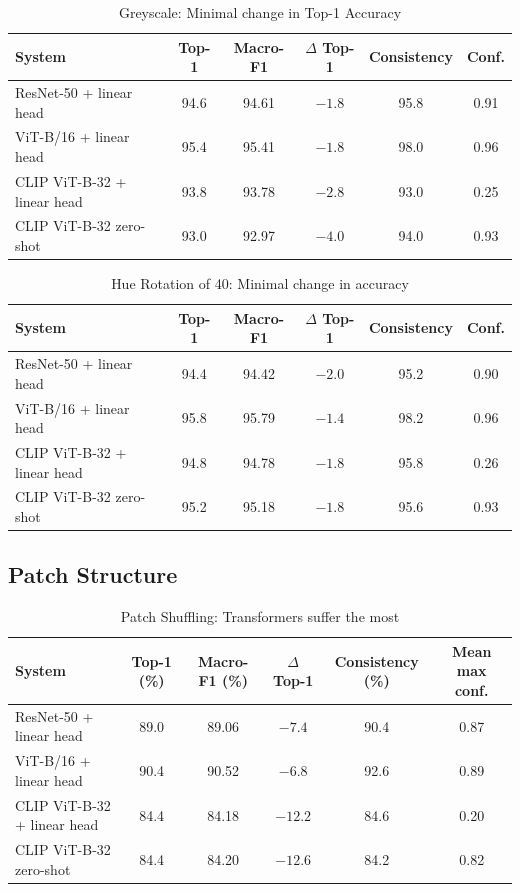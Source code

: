 \documentclass{article}
\begin{document}
\begin{table}[H]
  \caption{Greyscale: Minimal change in Top-1 Accuracy}
  \label{tab:grayscale}
  \centering
  \begin{tabular}{lccccc}
    \toprule
    System & Top-1 & Macro-F1 & $\Delta$ Top-1 & Consistency & Conf. \\
    \midrule
    ResNet-50 + linear head     & 94.6 & 94.61 & $-1.8$ & 95.8 & 0.91 \\
    ViT-B/16 + linear head      & 95.4 & 95.41 & $-1.8$ & 98.0 & 0.96 \\
    CLIP ViT-B-32 + linear head & 93.8 & 93.78 & $-2.8$ & 93.0 & 0.25 \\
    CLIP ViT-B-32 zero-shot     & 93.0 & 92.97 & $-4.0$ & 94.0 & 0.93 \\
    \bottomrule
  \end{tabular}
\end{table}

\begin{table}[H]
  \caption{Hue Rotation of 40: Minimal change in accuracy}
  \label{tab:hue40}
  \centering
  \begin{tabular}{lccccc}
    \toprule
    System & Top-1 & Macro-F1 & $\Delta$ Top-1 & Consistency & Conf. \\
    \midrule
    ResNet-50 + linear head     & 94.4 & 94.42 & $-2.0$ & 95.2 & 0.90 \\
    ViT-B/16 + linear head      & 95.8 & 95.79 & $-1.4$ & 98.2 & 0.96 \\
    CLIP ViT-B-32 + linear head & 94.8 & 94.78 & $-1.8$ & 95.8 & 0.26 \\
    CLIP ViT-B-32 zero-shot     & 95.2 & 95.18 & $-1.8$ & 95.6 & 0.93 \\
    \bottomrule
  \end{tabular}
\end{table}

\subsection{Patch Structure}

\begin{table}[H]
  \caption{Patch Shuffling: Transformers suffer the most}
  \label{tab:patch-shuffle}
  \centering
  \begin{tabular}{lccccc}
    \toprule
    System & Top-1 (\%) & Macro-F1 (\%) & $\Delta$ Top-1 & Consistency (\%) & Mean max conf. \\
    \midrule
    ResNet-50 + linear head     & 89.0 & 89.06 & $-7.4$  & 90.4 & 0.87 \\
    ViT-B/16 + linear head      & 90.4 & 90.52 & $-6.8$  & 92.6 & 0.89 \\
    CLIP ViT-B-32 + linear head & 84.4 & 84.18 & $-12.2$ & 84.6 & 0.20 \\
    CLIP ViT-B-32 zero-shot     & 84.4 & 84.20 & $-12.6$ & 84.2 & 0.82 \\
    \bottomrule
  \end{tabular}
\end{table}
\end{document}
